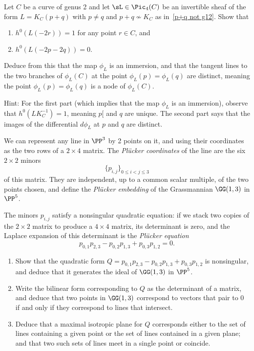  
\begin{exercise}\label{nodal quartic}
Let $C$ be a  curve of genus 2 and let $\sL\in \Pic_4(C)$ be an invertible sheaf of the form $L = K_C(p+q)$ with $p \neq q$ and $p+q \not\sim K_C$ as in~\ref{p+q not g12}. Show that
\begin{enumerate}
\item $h^0(L(-2r))= 1$ for any point $r \in C$, and
\item $h^0(L(-2p-2q)) = 0$.
\end{enumerate}
Deduce from this that the map $\phi_L$ is an immersion, and that the tangent lines to the two branches of $\phi_L(C)$ at the point $\phi_L(p) = \phi_L(q)$ are distinct, meaning the point $\phi_L(p) = \phi_L(q)$ is a node of $\phi_L(C)$.

Hint: For the first part (which implies that the map $\phi_L$ is an immersion), observe that $h^0(LK_C^{-1}) = 1$, meaning $p[$ and $q$ are unique. The second part says that the images of the differential $d\phi_L$ at $p$ and $q$ are distinct. 
\end{exercise}


 
 
\begin{exercise}\label{G13}
We can represent any line in $\PP^3$ by 2 points on it, and using their coordinates as the two rows of a 
$2\times 4$ matrix. The \emph{Pl\"ucker coordinates} of the line are the six $2\times 2$ minors
$$
\{p_{i,j}\}_{0\leq i<j\leq 3}
$$
of this matrix. They are independent, up to a common scalar multiple, of the two points chosen, and define the \emph{Pl\"ucker embedding} of the Grassmannian $\GG(1,3)$ in $\PP^5$.

The minors $p_{i,j}$  satisfy a nonsingular quadratic equation: if we stack two copies of the $2\times 2$
matrix to produce a $4\times 4$ matrix, its determinant is zero, and the Laplace expansion of this determinant
is the \emph{Pl\"ucker equation}
$$
p_{0,1}p_{2,3}-p_{0,2}p_{1,3}+p_{0,3}p_{1,2} = 0.
$$

\begin{enumerate}
\item Show that the quadratic form
$
Q = p_{0,1}p_{2,3}-p_{0,2}p_{1,3}+p_{0,3}p_{1,2}
$
is nonsingular, and deduce that it generates the ideal of $\GG(1,3)$ in $\PP^5$.
\item
Write the bilinear form corresponding to $Q$ as the determinant of a matrix, and deduce that 
two points in $\GG(1,3)$ correspond to vectors that pair to 0 if and only if they correspond to lines that intersect.
\item Deduce that a maximal isotropic plane for $Q$ corresponds either to the set of lines containing a given point or the set of lines contained in a given plane; and that two such sets of lines meet in a single point or coincide.
\end{enumerate}
\end{exercise}




